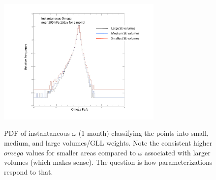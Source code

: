 \documentclass[twocol]{ametsoc}
\begin{document}
\begin{figure}[t]
\noindent\includegraphics[width=19pc,angle=0]{figs/omega-se-volumes.pdf}\\
\caption{PDF of instantaneous $\omega$ (1 month) classifying the points into small, medium, and large volumes/GLL 
weights. Note the consistent higher $omega$ values for smaller areas compared to $\omega$ associated with larger volumes (which makes sense). The question is how parameterizations respond to that.}\label{fig:omega-se-volumes}
\end{figure}
\end{document}
